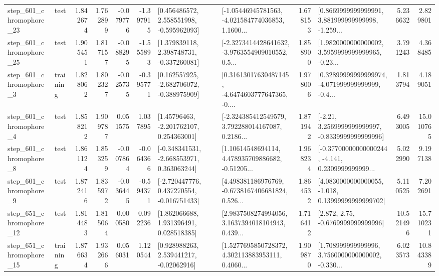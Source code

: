 \begin{tabular}{llrrrrllrlrr}
  step\_601\_chromophore\_23 &      test &      1.842674 &    1.762899 &     -0.079776 & -1.397915 &    [0.456486572, 2.558551998, -0.595962093] &  [-1.05446945781563, -4.021584774036853, 1.1600... &       1.678153 &  [0.8669999999999991, 3.881999999999998, -1.259... &            5.236632 &          2.829801 \\
  step\_601\_chromophore\_25 &      test &      1.905451 &    1.817157 &     -0.088295 & -1.555893 &    [1.379839118, 2.398748731, -0.337260081] &  [-2.3273414428641632, -3.9763554909010552, 0.5... &       1.858900 &  [1.9820000000000002, 3.5959999999999965, -0.23... &            3.791243 &          4.368485 \\
   step\_601\_chromophore\_3 &  training &      1.828062 &    1.802327 &     -0.025735 & -0.395771 &   [0.162557925, -2.682706072, -0.388975909] &  [0.31613017630487145, -4.6474603777647365, -0.... &       1.978006 &  [0.32899999999999974, -4.071999999999999, -0.4... &            1.813794 &          4.189051 \\
   step\_601\_chromophore\_4 &      test &      1.858212 &    1.909787 &      0.051575 &  1.037895 &     [1.45796463, -2.201762107, 0.254363001] &  [-2.324385412549579, 3.792288014167087, 0.2186... &       1.871942 &   [-2.21, 3.2569999999999997, -0.8339999999999996] &            6.493005 &         15.010765 \\
   step\_601\_chromophore\_8 &      test &      1.861124 &    1.853259 &     -0.007864 & -0.064366 &   [-0.348341531, -2.668553971, 0.363063244] &  [1.10614548694114, 4.478935709886682, -0.51205... &       1.968234 &  [-0.37700000000000244, -4.141, 0.2309999999999... &            5.022990 &          9.197138 \\
   step\_601\_chromophore\_9 &      test &      1.872416 &    1.835972 &     -0.036445 & -0.594371 &   [-2.720447776, 0.437270554, -0.016751433] &  [4.498381186976769, -0.6738167406681824, 0.526... &       1.864532 &  [4.0830000000000055, -1.018, 0.13999999999999702] &            5.110525 &          7.202691 \\
  step\_651\_chromophore\_12 &      test &      1.814483 &    1.815064 &      0.000580 &  0.092236 &     [1.862066688, 1.931396491, 0.028518385] &  [2.9837508274994056, 3.1637394018104943, 0.439... &       1.716412 &                 [2.872, 2.75, -0.6769999999999996] &           10.521496 &         15.710231 \\
  step\_651\_chromophore\_15 &  training &      1.876634 &    1.932666 &      0.056031 &  1.120544 &     [0.928988263, 2.539441217, -0.02062916] &  [1.5277695850728372, 4.302113883953111, 0.4060... &       1.909870 &  [1.708999999999996, 3.7560000000000002, -0.330... &            6.023573 &         10.843389 \\

\end{tabular}
